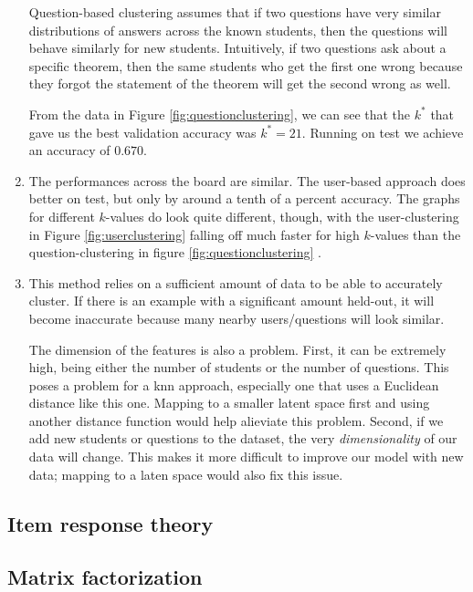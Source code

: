 \documentclass[twocolumn]{article}
\begin{document}
\begin{enumerate}
Question-based clustering assumes that if two questions have very similar
distributions of answers across the known students, then the questions will
behave similarly for new students. Intuitively, if two questions ask about a
specific theorem, then the same students who get the first one wrong because
they forgot the statement of the theorem will get the second wrong as well.

From the data in Figure \ref{fig:questionclustering}, we can see that the $k^*$ that gave us the best validation
accuracy was $k^* = 21$. Running on test we achieve an accuracy of $0.670$.

\item
The performances across the board are similar. The user-based approach does
better on test, but only by around a tenth of a percent accuracy. The graphs
for different $k$-values do look quite different, though, with the
user-clustering in Figure \ref{fig:userclustering} falling off much faster for
high $k$-values than the question-clustering in figure
\ref{fig:questionclustering} .

\item

This method relies on a sufficient amount of data to be able to accurately
cluster. If there is an example with a significant amount held-out, it will
become inaccurate because many nearby users/questions will look similar.

The dimension of the features is also a problem. First, it can be extremely
high, being either the number of students or the number of questions. This
poses a problem for a {\sc knn} approach, especially one that uses a Euclidean
distance like this one. Mapping to a smaller latent space first and using
another distance function would help alieviate this problem. Second, if we add
new students or questions to the dataset, the very {\it dimensionality} of our
data will change. This makes it more difficult to improve our model with new
data; mapping to a laten space would also fix this issue.

\end{enumerate}

\subsection{Item response theory}
\blindtext

\subsection{Matrix factorization}
\blindtext
\end{document}
